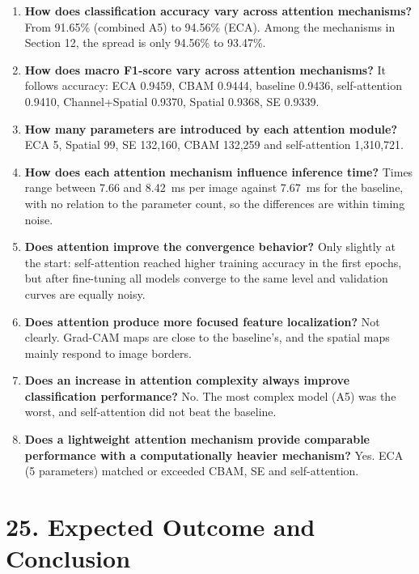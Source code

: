 \documentclass[11pt]{article}
\begin{document}
\begin{enumerate}
\item \textbf{How does classification accuracy vary across attention mechanisms?}
From 91.65\% (combined A5) to 94.56\% (ECA). Among the mechanisms in
Section 12, the spread is only 94.56\% to 93.47\%.

\item \textbf{How does macro F1-score vary across attention mechanisms?}
It follows accuracy: ECA 0.9459, CBAM 0.9444, baseline 0.9436,
self-attention 0.9410, Channel+Spatial 0.9370, Spatial 0.9368, SE 0.9339.

\item \textbf{How many parameters are introduced by each attention module?}
ECA 5, Spatial 99, SE 132{,}160, CBAM 132{,}259 and self-attention
1{,}310{,}721.

\item \textbf{How does each attention mechanism influence inference time?}
Times range between 7.66 and 8.42~ms per image against 7.67~ms for the
baseline, with no relation to the parameter count, so the differences are
within timing noise.

\item \textbf{Does attention improve the convergence behavior?}
Only slightly at the start: self-attention reached higher training accuracy
in the first epochs, but after fine-tuning all models converge to the same
level and validation curves are equally noisy.

\item \textbf{Does attention produce more focused feature localization?}
Not clearly. Grad-CAM maps are close to the baseline's, and the spatial
maps mainly respond to image borders.

\item \textbf{Does an increase in attention complexity always improve classification performance?}
No. The most complex model (A5) was the worst, and self-attention did not
beat the baseline.

\item \textbf{Does a lightweight attention mechanism provide comparable performance with a computationally heavier mechanism?}
Yes. ECA (5 parameters) matched or exceeded CBAM, SE and self-attention.
\end{enumerate}

\section*{25. Expected Outcome and Conclusion}
\end{document}
